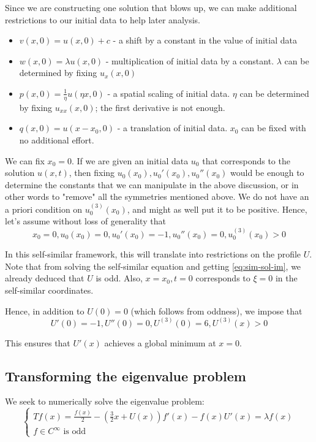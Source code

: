 \documentclass[11pt,a4paper]{article}
\begin{document}
Since we are constructing one solution that blows up, we can make additional restrictions to our initial data to help later analysis. 
\begin{itemize}
    \item $v(x,0) = u(x,0) + c$ - a shift by a constant in the value of initial data
    \item $w(x,0) = \lambda u(x,0)$ - multiplication of initial data by a constant. $\lambda$ can be determined by fixing $u_x(x,0)$
    \item $p(x,0) = \frac{1}{\eta} u(\eta x,0)$ - a spatial scaling of initial data. $\eta$ can be determined by fixing $u_{xx}(x,0)$; the first derivative is not enough.
    \item $q(x,0) = u(x-x_0,0)$ - a translation of initial data. $x_0$ can be fixed with no additional effort.
\end{itemize}
We can fix $x_0 = 0$. If we are given an initial data $u_0$ that corresponds to the solution $u(x,t)$, then fixing $u_0(x_0), u_0'(x_0), u_0''(x_0)$ would be enough to determine the constants that we can manipulate in the above discussion, or in other words to "remove" all the symmetries mentioned above. We do not have an a priori condition on $u_0^{(3)}(x_0)$, and might as well put it to be positive. Hence, let's assume without loss of generality that
\begin{equation}\label{eq:remove-symmetries-init}
    x_0 = 0, u_0(x_0) = 0, u_0'(x_0) = -1, u_0''(x_0) = 0, u_0^{(3)}(x_0) >0
\end{equation}

In this self-similar framework, this will translate into restrictions on the profile $U$. Note that from solving the self-similar equation and getting \ref{eq:sim-sol-im}, we already deduced that $U$ is odd. Also, $x=x_0, t = 0$ corresponds to $\xi = 0$ in the self-similar coordinates.

Hence, in addition to $U(0) = 0$ (which follows from oddness), we impose that 
\begin{equation}\label{eq:remove-symmetries-self-sim}
    U'(0) = -1, U''(0) = 0, U^{(3)}(0) = 6, U^{(3)}(x)>0
\end{equation}

This ensures that $U'(x)$ achieves a global minimum at $x=0$.

\subsection{Transforming the eigenvalue problem}
We seek to numerically solve the eigenvalue problem:
\begin{equation} \label{eq:problem-orig}
    \begin{cases}
        Tf(x) = \frac{f(x)}{2} - \left(\frac{3}{2}x + U(x)\right)f'(x) - f(x)U'(x) = \lambda f (x)\\
        f \in C^\infty \text{ is odd}
    \end{cases}
\end{equation}
\end{document}

